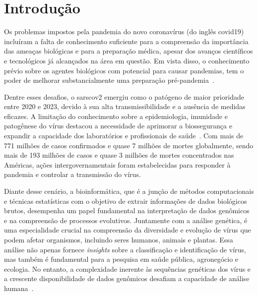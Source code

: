 
\chapter{Introdução}

\setlength{\parskip}{0.3cm}

Os problemas impostos pela pandemia do novo coronavírus (do inglês \gls{covid19}) incluíram a falta de conhecimento suficiente para a compreensão da importância das ameaças biológicas e para a preparação médica, apesar dos avanços científicos e tecnológicos já alcançados na área em questão\cite{coronavirus_binsfeld_2020}. Em vista disso, o conhecimento prévio sobre os agentes biológicos com potencial para causar pandemias, tem o poder de melhorar substancialmente uma preparação pré-pandemia~\cite{behl_threat_2022}.

Dentre esses desafios, o \gls{sarscov2} emergiu como o patógeno de maior prioridade entre 2020 e 2023, devido à sua alta transmissibilidade e a ausência de medidas eficazes. A limitação do conhecimento sobre a epidemiologia, imunidade e patogênese do vírus destacou a necessidade de aprimorar a biossegurança e expandir a capacidade dos laboratórios e profissionais de saúde~\cite{sarscov2_covidsurg_2021,sarscov2_deigin_2021, multiple_kuchipudi_2022, efficacy_madhi_2021}. Com mais de 771 milhões de casos confirmados e quase 7 milhões de mortes globalmente, sendo mais de 193 milhões de casos e quase 3 milhões de mortes concentrados nas Américas\cite{who_covid19}, ações intergovernamentais foram estabelecidas para responder à pandemia e controlar a transmissão do vírus.

Diante desse cenário, a bioinformática, que é a junção de métodos computacionais e técnicas estatísticas com o objetivo de extrair informações de dados biológicos brutos, desempenha um papel fundamental na interpretação de dados genômicos e na compreensão de processos evolutivos\cite{herramientas_gonzales_2016}. Juntamente com a análise genética, é uma especialidade crucial na compreensão da diversidade e evolução de vírus que podem afetar organismos, incluindo seres humanos, animais e plantas. Essa análise não apenas fornece \textit{insights} sobre a classificação e identificação de vírus, mas também é fundamental para a pesquisa em saúde pública, agronegócio e ecologia. No entanto, a complexidade inerente às sequências genéticas dos vírus e a crescente disponibilidade de dados genômicos desafiam a capacidade de análise humana~\cite{virology_edward_2007, diversidade_flores_2000}.

